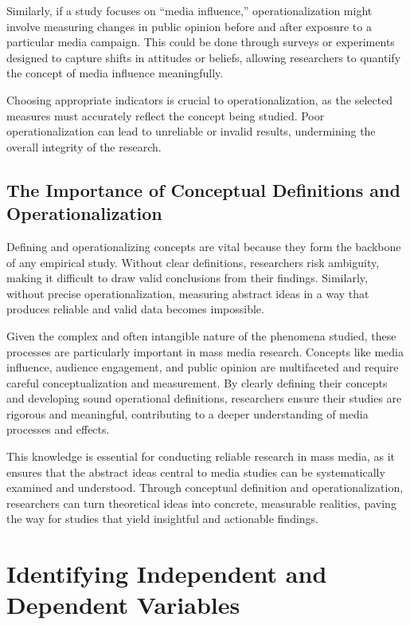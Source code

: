 \documentclass[
]{book}
\begin{document}
Similarly, if a study focuses on ``media influence,'' operationalization might involve measuring changes in public opinion before and after exposure to a particular media campaign. This could be done through surveys or experiments designed to capture shifts in attitudes or beliefs, allowing researchers to quantify the concept of media influence meaningfully.

Choosing appropriate indicators is crucial to operationalization, as the selected measures must accurately reflect the concept being studied. Poor operationalization can lead to unreliable or invalid results, undermining the overall integrity of the research.

\subsection*{The Importance of Conceptual Definitions and Operationalization}\label{the-importance-of-conceptual-definitions-and-operationalization}

Defining and operationalizing concepts are vital because they form the backbone of any empirical study. Without clear definitions, researchers risk ambiguity, making it difficult to draw valid conclusions from their findings. Similarly, without precise operationalization, measuring abstract ideas in a way that produces reliable and valid data becomes impossible.

Given the complex and often intangible nature of the phenomena studied, these processes are particularly important in mass media research. Concepts like media influence, audience engagement, and public opinion are multifaceted and require careful conceptualization and measurement. By clearly defining their concepts and developing sound operational definitions, researchers ensure their studies are rigorous and meaningful, contributing to a deeper understanding of media processes and effects.

This knowledge is essential for conducting reliable research in mass media, as it ensures that the abstract ideas central to media studies can be systematically examined and understood. Through conceptual definition and operationalization, researchers can turn theoretical ideas into concrete, measurable realities, paving the way for studies that yield insightful and actionable findings.

\section{Identifying Independent and Dependent Variables}\label{identifying-independent-and-dependent-variables}
\end{document}
